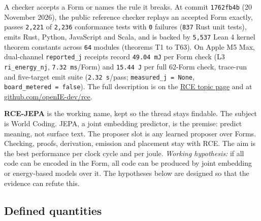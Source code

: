 \documentclass[10pt,letterpaper]{article}
\begin{document}
A checker accepts a Form or names the rule it breaks. At commit
\texttt{1762fb4b} (20 November 2026), the public reference checker
replays an accepted Form exactly, passes \texttt{2,221} of
\texttt{2,236} conformance tests with \texttt{0} failures (\texttt{837}
Rust unit tests), emits Rust, Python, JavaScript and Scala, and is
backed by \texttt{5,537} Lean 4 kernel theorem constants across
\texttt{64} modules (theorems T1 to T63). On Apple M5 Max, dual-channel
\texttt{reported\_\allowbreak{}j} receipts record \texttt{49.04\ mJ} per Form check
(L3 \texttt{ri\_\allowbreak{}energy\_\allowbreak{}nj}, \texttt{7.32\ ms}/\allowbreak{}Form) and
\texttt{15.44\ J} per full 62-Form check, trace-run and five-target emit
suite (\texttt{2.32\ s}/\allowbreak{}pass; \texttt{measured\_\allowbreak{}j\ =\ None},
\texttt{board\_\allowbreak{}metered\ =\ false}). The full description is on the
\href{https://research.openie.dev/about/rce/}{RCE topic page} and at
\href{https://github.com/openIE-dev/rce}{github.com/openIE-dev/rce}.

\textbf{RCE-JEPA} is the working name, kept so the thread stays
findable. The subject is World Coding. JEPA, a joint embedding
predictor, is the premise: predict meaning, not surface text. The
proposer slot is any learned proposer over Forms. Checking, proofs,
derivation, emission and placement stay with RCE. The aim is the best
performance per clock cycle and per joule. \emph{Working hypothesis:} if
all code can be encoded in the Form, all code can be produced by joint
embedding or energy-based models over it. The hypotheses below are
designed so that the evidence can refute this.

\subsection{Defined quantities}\label{defined-quantities}
\end{document}
